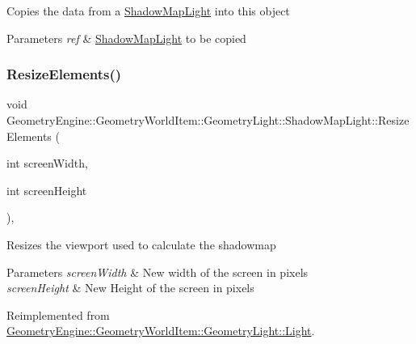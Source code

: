Copies the data from a \mbox{\hyperlink{class_geometry_engine_1_1_geometry_world_item_1_1_geometry_light_1_1_shadow_map_light}{Shadow\+Map\+Light}} into this object 
\begin{DoxyParams}{Parameters}
{\em ref} & \mbox{\hyperlink{class_geometry_engine_1_1_geometry_world_item_1_1_geometry_light_1_1_shadow_map_light}{Shadow\+Map\+Light}} to be copied \\
\hline
\end{DoxyParams}
\mbox{\label{class_geometry_engine_1_1_geometry_world_item_1_1_geometry_light_1_1_shadow_map_light_a3166b61bf08297eddf8b9e867c6d044a}} 
\subsubsection{\texorpdfstring{ResizeElements()}{ResizeElements()}}
{\footnotesize\ttfamily void Geometry\+Engine\+::\+Geometry\+World\+Item\+::\+Geometry\+Light\+::\+Shadow\+Map\+Light\+::\+Resize\+Elements (\begin{DoxyParamCaption}\item[{int}]{screen\+Width,  }\item[{int}]{screen\+Height }\end{DoxyParamCaption})\hspace{0.3cm}{\ttfamily [override]}, {\ttfamily [virtual]}}

Resizes the viewport used to calculate the shadowmap 
\begin{DoxyParams}{Parameters}
{\em screen\+Width} & New width of the screen in pixels \\
\hline
{\em screen\+Height} & New Height of the screen in pixels \\
\hline
\end{DoxyParams}


Reimplemented from \mbox{\hyperlink{class_geometry_engine_1_1_geometry_world_item_1_1_geometry_light_1_1_light_a18009ba6ef9c788f3d33d1ebd78a2140}{Geometry\+Engine\+::\+Geometry\+World\+Item\+::\+Geometry\+Light\+::\+Light}}.

\mbox{\label{class_geometry_engine_1_1_geometry_world_item_1_1_geometry_light_1_1_shadow_map_light_a0465932bd0494929e5daa10ce8b77aa6}} 

